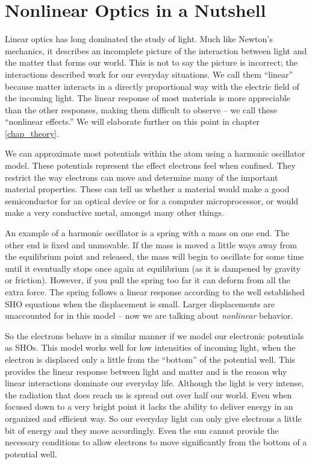 \documentclass[10pt]{article}
\begin{document}
\section{Nonlinear Optics in a Nutshell}\label{chap_intro_nonlin}
Linear optics has long dominated the study of light. Much like Newton's mechanics, it describes an incomplete picture of the interaction between light and the matter that forms our world. This is not to say the picture is incorrect; the interactions described work for our everyday situations. We call them ``linear'' because matter interacts in a directly proportional way with the electric field of the incoming light. The linear response of most materials is more appreciable than the other responses, making them difficult to observe -- we call these ``nonlinear effects.'' We will elaborate further on this point in chapter \ref{chap_theory}.

We can approximate most potentials within the atom using a harmonic oscillator model. These potentials represent the effect electrons feel when confined. They restrict the way electrons can move and determine many of the important material properties. These can tell us whether a material would make a good semiconductor for an optical device or for a computer microprocessor, or would make a very conductive metal, amongst many other things.

An example of a harmonic oscillator is a spring with a mass on one end. The other end is fixed and unmovable. If the mass is moved a little ways away from the equilibrium point and released, the mass will begin to oscillate for some time until it eventually stops once again at equilibrium (as it is dampened by gravity or friction). However, if you pull the spring too far it can deform from all the extra force. The spring follows a linear response according to the well established SHO equations when the displacement is small. Larger displacements are unaccounted for in this model -- now we are talking about \emph{nonlinear} behavior.

So the electrons behave in a similar manner if we model our electronic potentials as SHOs. This model works well for low intensities of incoming light, when the electron is displaced only a little from the ``bottom'' of the potential well. This provides the linear response between light and matter and is the reason why linear interactions dominate our everyday life. Although the light is very intense, the radiation that does reach us is spread out over half our world. Even when focused down to a very bright point it lacks the ability to deliver energy in an organized and efficient way. So our everyday light can only give electrons a little bit of energy and they move accordingly. Even the sun cannot provide the necessary conditions to allow electrons to move significantly from the bottom of a potential well.
\end{document}
